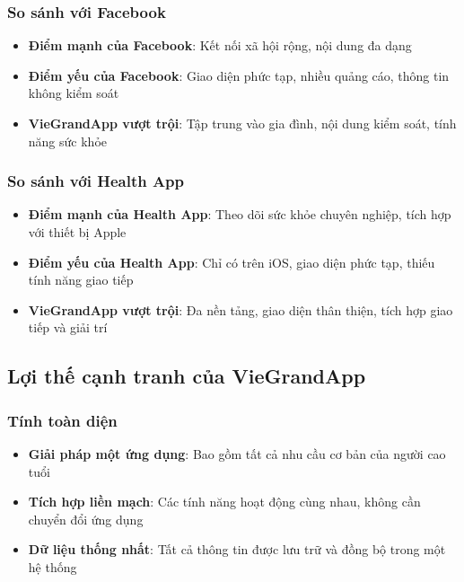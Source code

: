 \documentclass[12pt,a4paper]{article}
\begin{document}
\subsubsection{So sánh với Facebook}
\begin{itemize}[leftmargin=2cm]
    \item \textbf{Điểm mạnh của Facebook}: Kết nối xã hội rộng, nội dung đa dạng
    \item \textbf{Điểm yếu của Facebook}: Giao diện phức tạp, nhiều quảng cáo, thông tin không kiểm soát
    \item \textbf{VieGrandApp vượt trội}: Tập trung vào gia đình, nội dung kiểm soát, tính năng sức khỏe
\end{itemize}

\subsubsection{So sánh với Health App}
\begin{itemize}[leftmargin=2cm]
    \item \textbf{Điểm mạnh của Health App}: Theo dõi sức khỏe chuyên nghiệp, tích hợp với thiết bị Apple
    \item \textbf{Điểm yếu của Health App}: Chỉ có trên iOS, giao diện phức tạp, thiếu tính năng giao tiếp
    \item \textbf{VieGrandApp vượt trội}: Đa nền tảng, giao diện thân thiện, tích hợp giao tiếp và giải trí
\end{itemize}

\subsection{Lợi thế cạnh tranh của VieGrandApp}

\subsubsection{Tính toàn diện}
\begin{itemize}[leftmargin=2cm]
    \item \textbf{Giải pháp một ứng dụng}: Bao gồm tất cả nhu cầu cơ bản của người cao tuổi
    \item \textbf{Tích hợp liền mạch}: Các tính năng hoạt động cùng nhau, không cần chuyển đổi ứng dụng
    \item \textbf{Dữ liệu thống nhất}: Tất cả thông tin được lưu trữ và đồng bộ trong một hệ thống
\end{itemize}
\end{document}
